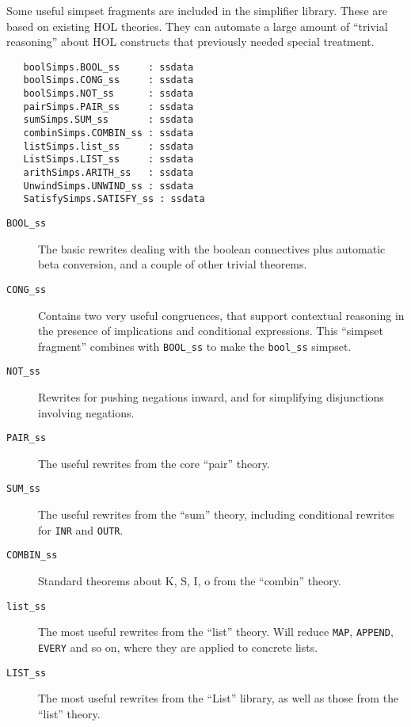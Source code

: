 Some useful simpset fragments are included in the simplifier library.
These are based on existing HOL theories.  They can automate a large
amount of ``trivial reasoning'' about HOL constructs that previously
needed special treatment. 
\begin{boxed}
\begin{verbatim}
   boolSimps.BOOL_ss     : ssdata
   boolSimps.CONG_ss     : ssdata
   boolSimps.NOT_ss      : ssdata
   pairSimps.PAIR_ss     : ssdata
   sumSimps.SUM_ss       : ssdata
   combinSimps.COMBIN_ss : ssdata
   listSimps.list_ss     : ssdata
   ListSimps.LIST_ss     : ssdata
   arithSimps.ARITH_ss   : ssdata
   UnwindSimps.UNWIND_ss : ssdata
   SatisfySimps.SATISFY_ss : ssdata
\end{verbatim}
\end{boxed}
\begin{description}
\item[{\tt BOOL\_ss}] The basic rewrites dealing with the boolean connectives
  plus automatic beta conversion, and a couple of other trivial
  theorems.

\item[{\tt CONG\_ss}] Contains two very useful congruences, that
  support contextual reasoning in the presence of implications and
  conditional expressions.  This ``simpset fragment'' combines with
  {\tt BOOL\_ss} to make the {\tt bool\_ss} simpset.

\item[{\tt NOT\_ss}] Rewrites for pushing negations inward, and for
  simplifying disjunctions involving negations.

\item[{\tt PAIR\_ss}] The useful rewrites from the core ``pair''
  theory.

\item[{\tt SUM\_ss}] The useful rewrites from the ``sum'' theory,
  including conditional rewrites for {\tt INR} and {\tt OUTR}.

\item[{\tt COMBIN\_ss}] Standard theorems about K, S, I, o from the
  ``combin'' theory.

\item[{\tt list\_ss}] The most useful rewrites from the ``list''
  theory.  Will reduce {\tt MAP}, {\tt APPEND}, {\tt EVERY} and so
  on, where they are applied to concrete lists.  

\item[{\tt LIST\_ss}] The most useful rewrites from the ``List''
  library, as well as those from the ``list'' theory.


\end{description}
